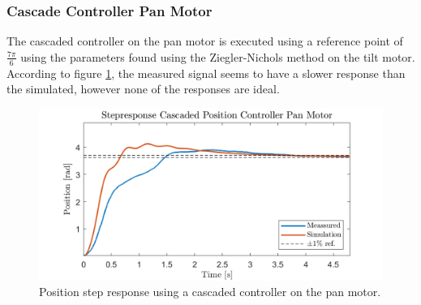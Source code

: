 \documentclass[../../main.tex]{subfiles}
\begin{document}
\subsubsection*{Cascade Controller Pan Motor}
The cascaded controller on the pan motor is executed using a reference point of $\frac{7\pi}{6}$ using the parameters found using the Ziegler-Nichols method on the tilt motor. According to figure \ref{fig:cascade_ZN_pan}, the measured signal seems to have a slower response than the simulated, however none of the responses are ideal.

\begin{figure}[h]
    \centering
    \includegraphics[width = 0.9 \textwidth]{Sections/Test/Images/cascade_ZN_pan.png}
    \caption{Position step response using a cascaded controller on the pan motor. }
    \label{fig:cascade_ZN_pan}
\end{figure}
\end{document}

